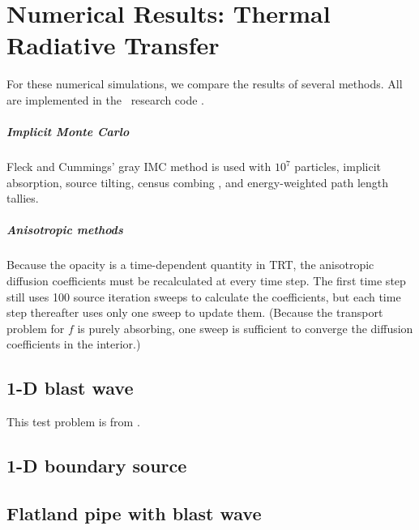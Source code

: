 
\chapter{Numerical Results: Thermal Radiative Transfer}
\label{chap:trtNumericalResults}

For these numerical simulations, we compare the results of several methods. All
are implemented in the \pytrt\ research code \cite{Pytrt}.

\paragraph{Implicit Monte Carlo} Fleck and Cummings' gray IMC method
\cite{Fle1971} is used with $10^7$ particles, implicit absorption, source
tilting, census combing \cite{Urb2006}, and energy-weighted path length tallies.

\paragraph{Anisotropic methods} Because the opacity is a time-dependent quantity
in TRT, the anisotropic diffusion coefficients must be recalculated at every
time step. The first time step still uses 100 source iteration sweeps to
calculate the coefficients, but each time step thereafter uses only one sweep to
update them. (Because the transport problem for $f$ is purely absorbing, one
sweep is sufficient to converge the diffusion coefficients in the interior.)

\section{1-D blast wave}
This test problem is from \cite{Rau2005,Ols2007}.

\section{1-D boundary source}

\section{Flatland pipe with blast wave}

